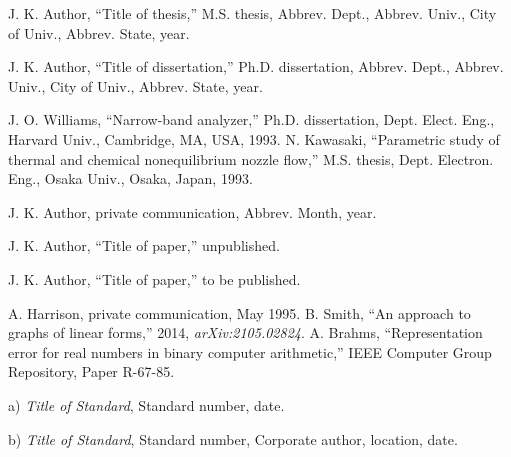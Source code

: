 \documentclass{IEEEtaes}
\begin{document}
\vspace*{-12pt}
\begin{thebibliography}{[31d]}
\item[] J. K. Author, ``Title of thesis,'' M.S. thesis, Abbrev. Dept., Abbrev. Univ., City of Univ., Abbrev. State, year.
\item[] J. K. Author, ``Title of dissertation,'' Ph.D. dissertation, Abbrev. Dept., Abbrev. Univ., City of Univ., Abbrev. State, year.
\end{thebibliography}

\vspace*{-12pt}
\begin{thebibliography}{[31d]}
\setcounter{enumiv}{18}
J. O. Williams, ``Narrow-band analyzer,'' Ph.D. dissertation, Dept. Elect. Eng., Harvard Univ., Cambridge, MA, USA, 1993.
N. Kawasaki, ``Parametric study of thermal and chemical nonequilibrium nozzle flow,'' M.S. thesis, Dept. Electron. Eng., Osaka Univ., Osaka, Japan, 1993.
\end{thebibliography}

\vspace*{-12pt}
\begin{thebibliography}{[31d]}
\item[] J. K. Author, private communication, Abbrev. Month, year.
\item[] J. K. Author, ``Title of paper,'' unpublished.
\item[] J. K. Author, ``Title of paper,'' to be published.
\end{thebibliography}

\vspace*{-12pt}

\begin{thebibliography}{[31d]}
\setcounter{enumiv}{20}
A. Harrison, private communication, May 1995.
B. Smith, ``An approach to graphs of linear forms,'' 2014, \emph{arXiv:2105.02824}.
A. Brahms, ``Representation error for real numbers in binary computer arithmetic,'' IEEE Computer Group Repository, Paper R-67-85.
\end{thebibliography}


\vspace*{-12pt}
\begin{thebibliography}{[31d]}
\item[a)]\emph{Title of Standard}, Standard number, date.
\item[b)]\emph{Title of Standard}, Standard number, Corporate author, location, date.
\end{thebibliography}
\end{document}
